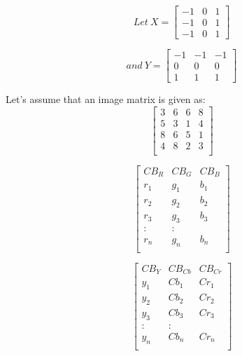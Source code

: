 
\[
Let ~X = 
    \begin{bmatrix}
    -1 & 0 & 1 \\
    -1 & 0 & 1 \\
    -1 & 0 & 1
    \end{bmatrix}
\] 

\[
and ~Y = 
    \begin{bmatrix}
    -1 & -1 & -1 \\
    0 & 0 & 0 \\
    1 & 1 & 1
    \end{bmatrix}
\]


Let’s assume that an image matrix is given as: 
     \[
    \left[ {\begin{array}{cccc}
    3 & 6 & 6 & 8\\
    5 & 3 & 1 & 4\\
    8 & 6 & 5 & 1\\
    4 & 8 & 2 & 3\\
    \end{array} } \right]
    \]

     \[
    \left[ {\begin{array}{ccc}
    CB_R & CB_G & CB_B \\
    r_1 & g_1 & b_1 \\
    r_2 & g_2 & b_2 \\
    r_3 & g_3 & b_3 \\
    :&:&\\
    r_n&g_n&b_n \\
    \end{array} } \right]
    \]



     \[
    \left[ {\begin{array}{ccc}
    CB_Y & CB_{Cb} & CB_{Cr} \\
    y_1 & Cb_1 & Cr_1 \\
    y_2 & Cb_2 & Cr_2 \\
    y_3 & Cb_3 & Cr_3 \\
    :&:&\\
    y_n&Cb_n&Cr_n \\
    \end{array} } \right]
    \]


